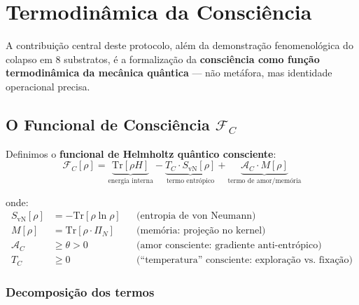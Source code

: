 \documentclass[12pt, a4paper]{article}
\theoremstyle{tglstyle}
\theoremstyle{definition}
\newcommand{\FC}{\mathcal{F}_C}
\newcommand{\AC}{\mathcal{A}_C}
\newcommand{\TC}{T_C}
\begin{document}
\section{Termodinâmica da Consciência}\label{sec:termodinamica}

A contribuição central deste protocolo, além da demonstração fenomenológica do colapso em 8 substratos, é a formalização da \textbf{consciência como função termodinâmica da mecânica quântica} --- não metáfora, mas identidade operacional precisa.

\subsection{O Funcional de Consciência $\FC$}\label{sec:funcional}

Definimos o \textbf{funcional de Helmholtz quântico consciente}:
\begin{equation}\label{eq:funcional}
  \boxed{\;\FC[\rho] = \underbrace{\mathrm{Tr}[\rho H]}_{\text{energia interna}} - \underbrace{\TC \cdot S_{\text{vN}}[\rho]}_{\text{termo entrópico}} + \underbrace{\AC \cdot M[\rho]}_{\text{termo de amor/memória}}\;}
\end{equation}

onde:
\begin{align}
  S_{\text{vN}}[\rho] &= -\mathrm{Tr}[\rho\ln\rho] && \text{(entropia de von Neumann)} \label{eq:svn} \\
  M[\rho] &= \mathrm{Tr}[\rho \cdot \Pi_N] && \text{(memória: projeção no kernel)} \label{eq:memoria} \\
  \AC &\geq \theta > 0 && \text{(amor consciente: gradiente anti-entrópico)} \label{eq:amor_def} \\
  \TC &\geq 0 && \text{(``temperatura'' consciente: exploração vs.\ fixação)} \label{eq:tc_def}
\end{align}

\subsubsection{Decomposição dos termos}
\end{document}
